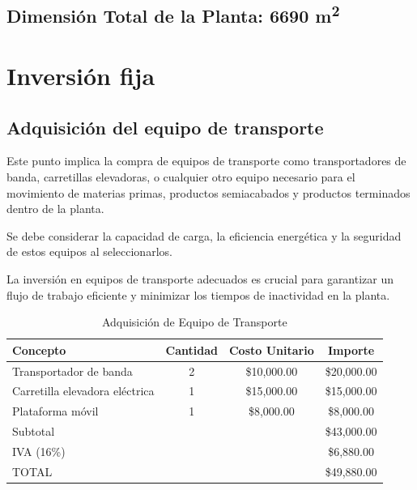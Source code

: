 \subsection*{\textbf{Dimensión Total de la Planta:} 6690 m\textsuperscript{2}}




\newpage

\section{Inversión fija}




\subsection{Adquisición del equipo de transporte}

Este punto implica la compra de equipos de transporte como transportadores de banda, carretillas elevadoras, o cualquier otro equipo necesario para el movimiento de materias primas, productos semiacabados y productos terminados dentro de la planta.

Se debe considerar la capacidad de carga, la eficiencia energética y la seguridad de estos equipos al seleccionarlos.

La inversión en equipos de transporte adecuados es crucial para garantizar un flujo de trabajo eficiente y minimizar los tiempos de inactividad en la planta.

\begin{table}[htbp]
    \centering
    \begin{tabular}{|l|c|c|c|}
        \hline
        \textbf{Concepto}               & \textbf{Cantidad} & \textbf{Costo Unitario} & \textbf{Importe} \\
        \hline
        Transportador de banda          & 2                 & \$10,000.00              & \$20,000.00      \\
        Carretilla elevadora eléctrica & 1                 & \$15,000.00              & \$15,000.00      \\
        Plataforma móvil                & 1                 & \$8,000.00               & \$8,000.00       \\
        \hline
        Subtotal                        &                   &                          & \$43,000.00      \\

        IVA (16\%)                      &                   &                          & \$6,880.00       \\
        \hline
        TOTAL                           &                   &                          & \$49,880.00      \\
        \hline
    \end{tabular}
    \caption{Adquisición de Equipo de Transporte}
    \label{tab:equipo_transporte}
\end{table}


